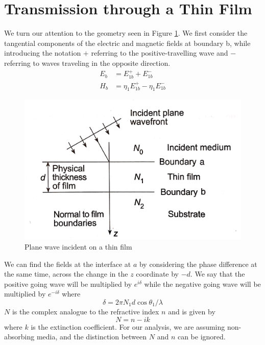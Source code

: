\documentclass{article}
\begin{document}
\section{Transmission through a Thin Film}
    We turn our attention to the geometry seen in Figure \ref{fig:film}. We first consider the tangential components of the electric and magnetic fields at boundary b, while introducing the notation $+$ referring to the positive-travelling wave and $-$ referring to waves traveling in the opposite direction.
    \begin{align}
        E_b &= E_{1b}^+ + E_{1b}^- \\
        H_b &= \eta_1 E_{1b}^+ - \eta_1 E_{1b}^-    
    \end{align}
    \begin{figure}
        \includegraphics[width=\linewidth]{thin_film.png}
        \caption{Plane wave incident on a thin film}
        \label{fig:film}
    \end{figure}
    We can find the fields at the interface at $a$ by considering the phase difference at the same time, across the change in the $z$ coordinate by $-d$. We say that the positive going wave will be multiplied by $e^{i \delta}$ while the negative going wave will be multiplied by $e^{-i \delta}$ where
    \begin{equation}
        \delta = 2 \pi N_1 d \cos \theta_1 / \lambda    
    \end{equation}
    $N$ is the complex analogue to the refractive index $n$ and is given by $$N = n - ik $$ where $k$ is the extinction coefficient. For our analysis, we are assuming non-absorbing media, and the distinction between $N$ and $n$ can be ignored.
    
\end{document}
